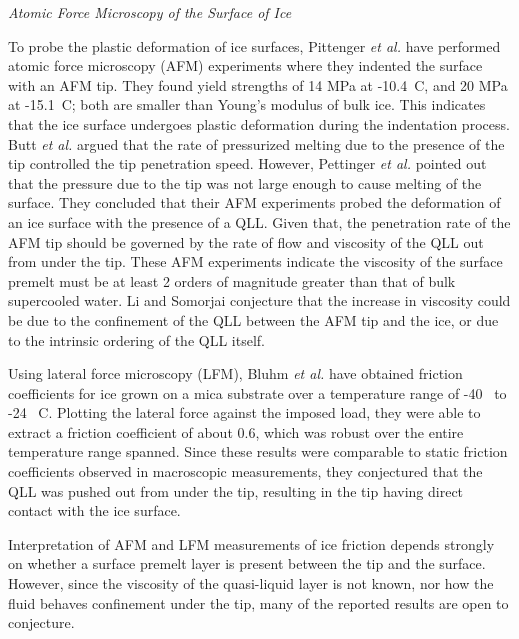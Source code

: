 \begin{flushleft}
\textit{Atomic Force Microscopy of the Surface of Ice}
\end{flushleft}

To probe the plastic deformation of ice surfaces, Pittenger \textit{et
  al.} have performed atomic force microscopy (AFM) experiments where
they indented the surface with an AFM tip.\cite{Butt2000,
  Pittenger2001,Bluhm2000} They found yield strengths of 14 MPa at
-10.4\degree~C, and 20 MPa at -15.1\degree~C; both are smaller than
Young's modulus of bulk ice. This indicates that the ice surface
undergoes plastic deformation during the indentation process. Butt
\textit{et al.}  argued that the rate of pressurized melting due to
the presence of the tip controlled the tip penetration
speed.\cite{Butt2000} However, Pettinger \textit{et al.} pointed out
that the pressure due to the tip was not large enough to cause melting
of the surface.\cite{Pittenger2001} They concluded that their AFM
experiments probed the deformation of an ice surface with the presence
of a QLL. Given that, the penetration rate of the AFM tip should be
governed by the rate of flow and viscosity of the QLL out from under
the tip. These AFM experiments indicate the viscosity of the surface
premelt must be at least 2 orders of magnitude greater than that of
bulk supercooled water. Li and Somorjai conjecture that the increase
in viscosity could be due to the confinement of the QLL between the
AFM tip and the ice, or due to the intrinsic ordering of the QLL
itself.\cite{Li2007}

Using lateral force microscopy (LFM), Bluhm \textit{et al.} have
obtained friction coefficients for ice grown on a mica substrate over
a temperature range of -40\degree~ to -24\degree~ C.\cite{Bluhm2000}
Plotting the lateral force against the imposed load, they were able to
extract a friction coefficient of about 0.6, which was robust over the
entire temperature range spanned. Since these results were comparable
to static friction coefficients observed in macroscopic measurements,
they conjectured that the QLL was pushed out from under the tip,
resulting in the tip having direct contact with the ice surface. 

Interpretation of AFM and LFM measurements of ice friction depends
strongly on whether a surface premelt layer is present between the tip
and the surface. However, since the viscosity of the quasi-liquid
layer is not known, nor how the fluid behaves confinement under the
tip, many of the reported results are open to conjecture.







